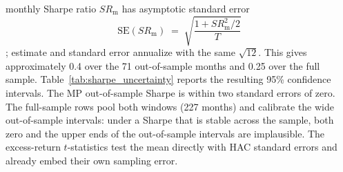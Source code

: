 \documentclass[11pt,a4paper]{article}
\begin{document}
\begin{enumerate}
  monthly Sharpe ratio $SR_{\mathrm{m}}$ has asymptotic standard error
  \[
    \mathrm{SE}(SR_{\mathrm{m}}) \;=\;
      \sqrt{\frac{1 + SR_{\mathrm{m}}^{2}/2}{T}}
  \]
  \citep{lo2002}; estimate and standard error annualize with the same
  $\sqrt{12}$. This gives approximately 0.4 over the 71 out-of-sample
  months and 0.25 over the full sample. Table~\ref{tab:sharpe_uncertainty}
  reports the resulting 95\% confidence intervals. The MP out-of-sample
  Sharpe is within two standard errors of zero. The full-sample rows
  pool both windows (227 months) and calibrate the wide out-of-sample
  intervals: under a Sharpe that is stable across the sample, both zero
  and the upper ends of the out-of-sample intervals are implausible.
  The excess-return $t$-statistics test the mean directly with
  HAC standard errors and already embed their own sampling error.


\end{enumerate}
\end{document}
